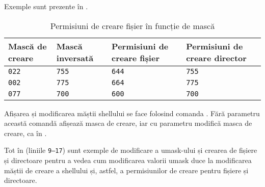 Exemple sunt prezente în .

\begin{table}[!htb]
  \begin{center}
    \begin{tabular}{ p{} p{} p{} p{} }
      \toprule
        \textbf{Mască de creare} &
        \textbf{Mască inversată} &
        \textbf{Permisiuni de creare fișier} &
        \textbf{Permisiuni de creare director} \\
      \midrule
        \texttt{022} &
        \texttt{755} &
        \texttt{644} &
        \texttt{755} \\
      \midrule
        \texttt{002} &
        \texttt{775} &
        \texttt{664} &
        \texttt{775} \\
      \midrule
        \texttt{077} &
        \texttt{700} &
        \texttt{600} &
        \texttt{700} \\
      \bottomrule
    \end{tabular}
  \end{center}
  \caption{Permisiuni de creare fișier în funcție de mască}
  \label{table:user:umask}
\end{table}

Afișarea și modificarea măștii shellului se face folosind comanda . Fără
parametru această comandă afișează masca de creare, iar cu parametru modifică
masca de creare, ca în .


Tot în  (liniile \texttt{9--17}) sunt exemple de modificare a umask-ului și crearea de fișiere și
directoare pentru a vedea cum modificarea valorii umask duce la modificarea
măștii de creare a shellului și, astfel, a permisiunilor de creare pentru
fișiere și directoare.

